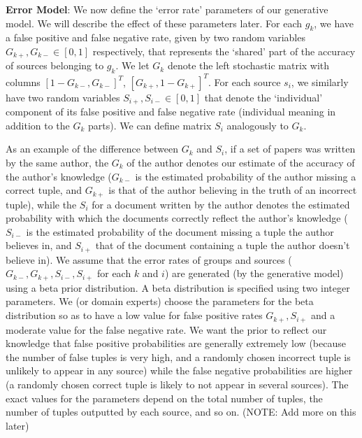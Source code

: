 \documentclass{sig-alternate}
\newcounter{prob}
\newcommand{\stitle}[1]{\vspace{0.5em}\noindent\textbf{#1}}
\begin{document}
\stitle{Error Model}: We now define the `error rate' parameters of our generative model. We will describe the effect of these parameters later. For each $g_k$, we have a false positive and false negative rate, given by two random variables $G_{k+},G_{k-} \in [0,1]$ respectively, that represents the `shared' part of the accuracy of sources belonging to $g_k$. We let $G_k$ denote the left stochastic matrix with columns $[1-G_{k-},G_{k-}]^T$, $[G_{k+},1-G_{k+}]^T$. For each source $s_i$, we similarly have two random variables $S_{i+},S_{i-} \in [0,1]$ that denote the `individual' component of its false positive and false negative rate (individual meaning in addition to the $G_k$ parts). We can define matrix $S_i$ analogously to $G_k$. 

As an example of the difference between $G_k$ and $S_i$, if a set of papers was written by the same author, the $G_k$ of the author denotes our estimate of the accuracy of the author's knowledge ($G_{k-}$ is the estimated probability of the author missing a correct tuple, and $G_{k+}$ is that of the author believing in the truth of an incorrect tuple), while the $S_i$ for a document written by the author denotes the estimated probability with which the documents correctly reflect the author's knowledge ($S_{i-}$ is the estimated probability of the document missing a tuple the author believes in, and $S_{i+}$ that of the document containing a tuple the author doesn't believe in). We assume that the error rates of groups and sources ($G_{k-}, G_{k+}, S_{i-}, S_{i+}$ for each $k$ and $i$) are generated (by the generative model) using a beta prior distribution. A beta distribution is specified using two integer parameters. We (or domain experts) choose the parameters for the beta distribution so as to have a low value for false positive rates $G_{k+}, S_{i+}$ and a moderate value for the false negative rate. We want the prior to reflect our knowledge that false positive probabilities are generally extremely low (because the number of false tuples is very high, and a randomly chosen incorrect tuple is unlikely to appear in any source) while the false negative probabilities are higher (a randomly chosen correct tuple is likely to not appear in several sources). The exact values for the parameters depend on the total number of tuples, the number of tuples outputted by each source, and so on. (NOTE: Add more on this later)
\end{document}
